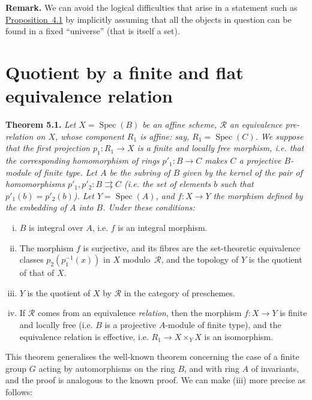 \documentclass{article}
\newenvironment{itenv}[1]
  {\phantomsection\par\medskip\noindent\textbf{#1.}\itshape}
  {\medskip}
\newenvironment{rmenv}[1]
  {\phantomsection\par\medskip\noindent\textbf{#1.}\rmfamily}
  {\medskip}
\renewcommand{\cal}[1]{{\mathcal{#1}}}
\DeclareMathOperator{\Spec}{Spec}
\newcommand{\oldpage}[1]{\marginpar{\footnotesize$\Big\vert$ \textit{p.~#1}}}
\begin{document}
\begin{rmenv}{Remark}
  We can avoid the logical difficulties that arise in a statement such as \hyperref[proposition4.1]{Proposition~4.1} by implicitly assuming that all the objects in question can be found in a fixed ``universe'' (that is itself a set).
\end{rmenv}


\section{Quotient by a finite and flat equivalence relation}
\label{5}

\begin{itenv}{Theorem 5.1}
\label{theorem5.1}
  Let $X=\Spec(B)$ be an affine scheme, $\cal{R}$ an equivalence pre-relation on $X$, whose component $R_1$ is affine: say, $R_1=\Spec(C)$.
  We suppose that the first projection $p_1\colon R_1\to X$ is a finite and locally free morphism, i.e. that the corresponding homomorphism of rings $p'_1\colon B\to C$ makes $C$ a projective $B$-module of finite type.
  Let $A$ be the subring of $B$ given by the kernel of the pair of homomorphisms $p'_1,p'_2\colon B\rightrightarrows C$ (i.e. the set of elements $b$ such that $p'_1(b)=p'_2(b)$).
  Let $Y=\Spec(A)$, and $f\colon X\to Y$ the morphism defined by the embedding of $A$ into $B$.
  Under these conditions:
  \begin{enumerate}[(i)]
    \item $B$ is integral over $A$, i.e. $f$ is an integral morphism.
    \item The morphism $f$ is surjective, and its fibres are the set-theoretic equivalence classes
\oldpage{212-13}
      $p_2(p_1^{-1}(x))$ in $X$ modulo~$\cal{R}$, and the topology of $Y$ is the quotient of that of $X$.
    \item $Y$ is the quotient of $X$ by $\cal{R}$ in the category of preschemes.
    \item If $\cal{R}$ comes from an equivalence \emph{relation}, then the morphism $f\colon X\to Y$ is finite and locally free (i.e. $B$ is a projective $A$-module of finite type), and the equivalence relation is effective, i.e. $R_1\to X\times_Y X$ is an isomorphism.
  \end{enumerate}
\end{itenv}

This theorem generalises the well-known theorem concerning the case of a finite group $G$ acting by automorphisms on the ring $B$, and with ring $A$ of invariants, and the proof is analogous to the known proof.
We can make (iii) more precise as follows:
\end{document}
